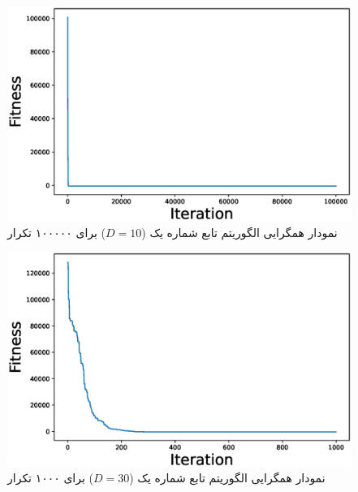  \begin{figure}[H]
	\caption{نمودار همگرایی الگوریتم  تابع شماره یک ($D=10$) برای ۱۰۰۰۰۰ تکرار } 
	\centering 
	\includegraphics[width=16cm]{../Figure/Q1/PSO_convergence_curve_10_ite_100000} 
\end{figure}



 \begin{figure}[H]
	\caption{نمودار همگرایی الگوریتم  تابع شماره یک ($D=30$) برای ۱۰۰۰ تکرار } 
	\centering 
	\includegraphics[width=16cm]{../Figure/Q1/PSO_convergence_curve_30_ite_1000} 
\end{figure}

